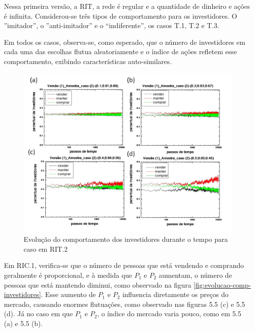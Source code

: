 \documentclass[brazil,ruledheader]{abnt}
\begin{document}
Nessa primeira versão, a RIT, a rede é regular e a quantidade de dinheiro e
ações é infinita. Considerou-se três tipos de comportamento para os
investidores. O ''imitador'', o ''anti-imitador'' e o “indiferente”, os
casos  T.1, T.2 e T.3. 

Em todos os casos, observa-se, como esperado, que o número de investidores
em cada uma das escolhas flutua aleatoriamente e o índice de ações refletem
esse comportamento, exibindo características auto-similares.

\begin{figure}[!h]
\centering
\includegraphics[width=0.8\linewidth]{Figuras/7.jpg}
 \caption[Evolução do comportamento dos investidores em RIT.2]{Evolução do
comportamento dos investidores durante o tempo para caso
em RIT.2 }
\label{fig:evolucao-comportamento2}
\end{figure}

Em RIC.1, verifica-se que o número de pessoas que está vendendo e comprando
geralmente é proporcional, e à medida que $P_1$ e $P_2$ aumentam, o número de
pessoas que está mantendo diminui, como observado na figura
\ref{fig:evolucao-comp-investidores}.  Esse aumento de $P_1$ e $P_2$ influencia
diretamente os preços do mercado, causando enormes flutuações, como observado
nas figuras 5.5 (c) e 5.5 (d). Já no caso em que $P_1$ e $P_2$, o
índice do mercado varia pouco, como em 5.5 (a) e 5.5 (b).
\end{document}
